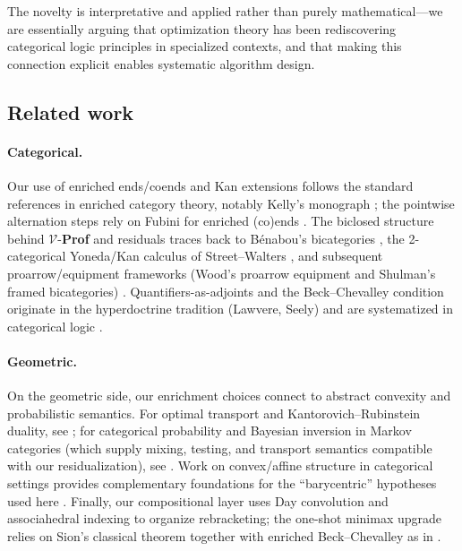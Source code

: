 \documentclass[11pt]{article}
\numberwithin{equation}{section}
\theoremstyle{upright}
\newcommand{\V}{\mathcal{V}}
\begin{document}
The novelty is interpretative and applied rather than purely mathematical—we are essentially arguing that optimization theory has been rediscovering categorical logic principles in specialized contexts, and that making this connection explicit enables systematic algorithm design.

\subsection*{Related work}
\paragraph{Categorical.}
Our use of enriched ends/coends and Kan extensions follows the standard references in enriched category theory, notably Kelly’s monograph \citet{Kelly1982}; the pointwise alternation steps rely on Fubini for enriched (co)ends \citep{Dubuc1970}. The biclosed structure behind $\V$-\textbf{Prof} and residuals traces back to Bénabou’s bicategories \citep{Benabou1967}, the 2-categorical Yoneda/Kan calculus of Street–Walters \citep{StreetWalters1978}, and subsequent proarrow/equipment frameworks (Wood’s proarrow equipment and Shulman’s framed bicategories) \citep{Wood1990,Shulman2008}. Quantifiers-as-adjoints and the Beck–Chevalley condition originate in the hyperdoctrine tradition (Lawvere, Seely) and are systematized in categorical logic \citep{Lawvere1969,Seely1983,Jacobs1999}. 

\paragraph{Geometric.}
On the geometric side, our enrichment choices connect to abstract convexity and probabilistic semantics. For optimal transport and Kantorovich–Rubinstein duality, see \citet{Villani2009}; for categorical probability and Bayesian inversion in Markov categories (which supply mixing, testing, and transport semantics compatible with our residualization), see \citet{Fritz2020Markov}. Work on convex/affine structure in categorical settings provides complementary foundations for the “barycentric” hypotheses used here \citep[e.g.][]{Fritz2009Convex, EdelmanJamison1985}. Finally, our compositional layer uses Day convolution \citep{Day1970} and associahedral indexing \citep{LodayRonco1998,Loday2004} to organize rebracketing; the one-shot minimax upgrade relies on Sion’s classical theorem \citep{Sion1958} together with enriched Beck–Chevalley as in \citet{Kelly1982}. 
\end{document}

